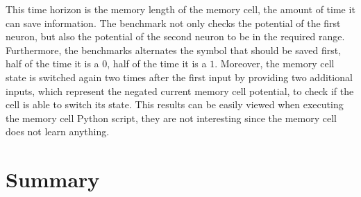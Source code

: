 \documentclass[draft,final]{vutinfth} %
\begin{document}
This time horizon is the memory length of the memory cell, the amount of time it can save information.
The benchmark not only checks the potential of the first neuron, but also the potential of the second neuron to be in the required range.
Furthermore, the benchmarks alternates the symbol that should be saved first, half of the time it is a $0$, half of the time it is a $1$.
Moreover, the memory cell state is switched again two times after the first input by providing two additional inputs, which represent the negated current memory cell potential, to check if the cell is able to switch its state.
This results can be easily viewed when executing the memory cell Python script, they are not interesting since the memory cell does not learn anything.

\chapter{Summary}


\backmatter

\listoffigures %

\cleardoublepage %
\listoftables %


\printindex

\printglossaries



\end{document}
